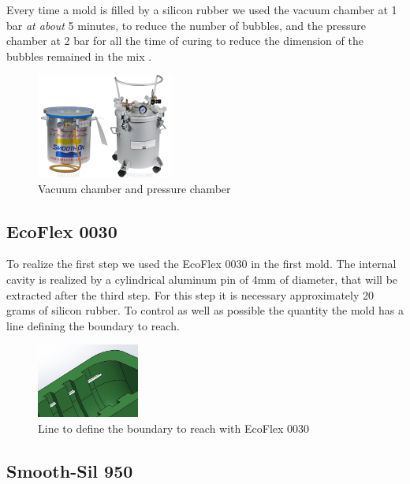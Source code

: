 \documentclass{article}
\begin{document}
Every time a mold is filled by a silicon rubber we used the vacuum chamber at 1 bar \emph{at about} 5 minutes, to reduce the number of bubbles, and the pressure chamber at 2 bar for all the time of curing to reduce the dimension of the bubbles remained in the mix .

\begin{figure}[h]
    \centering
    \includegraphics[width=0.4\textwidth]{Pictures/fingerOnToroidal/VacuumPressureChambers.png}
    \caption{Vacuum chamber and pressure chamber}
    \label{fig:vacuumPressureChamber}
\end{figure}



\subsection{EcoFlex 0030}
To realize the first step we used the EcoFlex 0030 in the first mold. The internal cavity is realized by a cylindrical aluminum pin of 4mm of diameter, that will be extracted after the third step.
For this step it is necessary approximately 20 grams of silicon rubber. 
To control as well as possible the quantity the mold has a line defining the boundary to reach.

\begin{figure}[h]
	\centering
	\includegraphics[width=0.3\textwidth]{Pictures/fingerOnToroidal/LineMoldFirstStep.JPG}
	\caption{Line to define the boundary to reach with EcoFlex 0030}
	\label{fig:ecoFlexLine}
\end{figure}


\subsection{Smooth-Sil 950}
\end{document}
